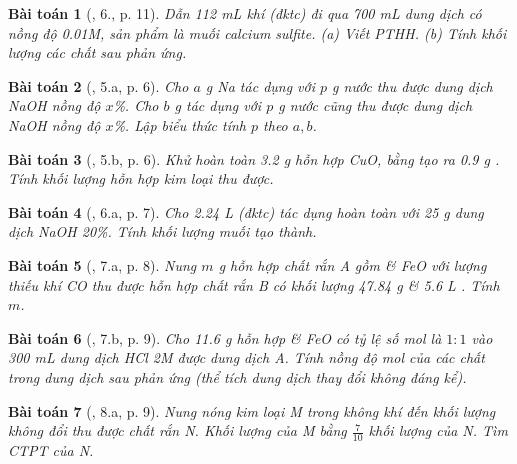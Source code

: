 \documentclass{article}
\newtheorem{baitoan}{Bài toán}
\begin{document}
\begin{baitoan}[\cite{SGK_Hoa_Hoc_9}, 6., p. 11]
	Dẫn \emph{112 mL} khí \emph{} (đktc) đi qua \emph{700 mL} dung dịch \emph{} có nồng độ \emph{0.01M}, sản phẩm là muối calcium sulfite. (a) Viết PTHH. (b) Tính khối lượng các chất sau phản ứng.
\end{baitoan}

\begin{baitoan}[\cite{An_350_BT_Hoa_Hoc_9}, 5.a, p. 6]
	Cho $a$ \emph{g Na} tác dụng với $p$ \emph{g} nước thu được dung dịch \emph{NaOH} nồng độ $x$\%. Cho $b$ \emph{g } tác dụng với $p$ \emph{g} nước cũng thu được dung dịch \emph{NaOH} nồng độ $x$\%. Lập biểu thức tính $p$ theo $a,b$.
\end{baitoan}

\begin{baitoan}[\cite{An_350_BT_Hoa_Hoc_9}, 5.b, p. 6]
	Khử hoàn toàn \emph{3.2 g} hỗn hợp \emph{CuO, } bằng \emph{} tạo ra \emph{0.9 g }. Tính khối lượng hỗn hợp kim loại thu được.
\end{baitoan}

\begin{baitoan}[\cite{An_350_BT_Hoa_Hoc_9}, 6.a, p. 7]
	Cho \emph{2.24 L } (đktc) tác dụng hoàn toàn với \emph{25 g} dung dịch \emph{NaOH 20\%}. Tính khối lượng muối tạo thành.
\end{baitoan}

\begin{baitoan}[\cite{An_350_BT_Hoa_Hoc_9}, 7.a, p. 8]
	Nung $m$ \emph{g} hỗn hợp chất rắn A gồm \emph{} \& \emph{FeO} với lượng thiếu khí \emph{CO} thu được hỗn hợp chất rắn B có khối lượng \emph{47.84 g} \& \emph{5.6 L }. Tính $m$.
\end{baitoan}

\begin{baitoan}[\cite{An_350_BT_Hoa_Hoc_9}, 7.b, p. 9]
	Cho \emph{11.6 g} hỗn hợp \emph{} \& \emph{FeO} có tỷ lệ số mol là $1:1$ vào \emph{300 mL} dung dịch \emph{HCl 2M} được dung dịch A. Tính nồng độ mol của các chất trong dung dịch sau phản ứng (thể tích dung dịch thay đổi không đáng kể).
\end{baitoan}

\begin{baitoan}[\cite{An_350_BT_Hoa_Hoc_9}, 8.a, p. 9]
	Nung nóng kim loại M trong không khí đến khối lượng không đổi thu được chất rắn N. Khối lượng của M bằng $\frac{7}{10}$ khối lượng của N. Tìm CTPT của N.
\end{baitoan}
\end{document}
